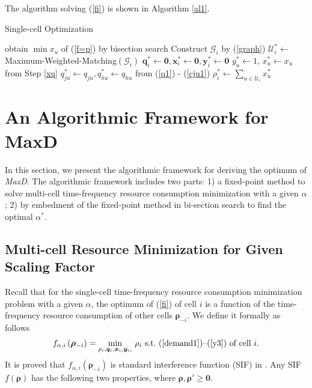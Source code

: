 \documentclass[10pt,journal,final,finalsubmission,twocolumn]{IEEEtran}
\begin{document}
The algorithm solving (\ref{fi}) is shown in Algorithm \ref{al1}.

 \begin{algorithm}[tbp]\label{al1}
\caption{Single-cell Optimization} 
{
	obtain $\min x_u$ of (\ref{f=p}) by bisection search\label{xu}\;
}
Construct $\mathcal{G}_i$ by (\ref{graph})\;
$\mathcal{U}^*_i\leftarrow $ Maximum-Weighted-Matching$\left (\mathcal{G}_i\right)$\label{MWM}\;
$\boldsymbol{q}^*_i \leftarrow \boldsymbol{0},\boldsymbol{x}^*_i \leftarrow \boldsymbol{0}, \boldsymbol{y}^*_i \leftarrow \boldsymbol{0}$\;
{
$y_u^*\leftarrow1$, $x_u^* \leftarrow x_u$ from Step \ref{xu} \;
$q_{ju}^*\leftarrow q_{ju}, q_{hu}^*\leftarrow q_{hu}$ from (\ref{q1}) - (\ref{cju1})\;
}
$\rho_i^*\leftarrow\sum_{u\in{\mathcal{U}}_i} x_u^*$\;
\;
\end{algorithm} 


\section{An Algorithmic Framework for MaxD}\label{CellLoadsMinimization}

In this section, we present the algorithmic framework for deriving the optimum of {\em MaxD}. The algorithmic framework includes two parts: 1) a fixed-point method to solve multi-cell time-frequency resource consumption minimization with a given $\alpha$; 2) by embedment of the fixed-point method in bi-section search to find the optimal $\alpha^*$.

\subsection{Multi-cell Resource Minimization for Given Scaling Factor}\label{MulticellLoadsMinimization}

Recall that for the single-cell time-frequency resource consumption minimization problem with a given $\alpha$, the optimum of (\ref{fi}) of cell $i$ is a function of the time-frequency resource consumption of other cells $\boldsymbol{\rho}_{-i}$. We define it formally as follows
\begin{equation}\label{fi2}
f_{\alpha,i}\left (\boldsymbol{\rho}_{-i}\right ) =  \underset{\rho_i, \boldsymbol{q}_i,\boldsymbol{x}_i,\boldsymbol{y}_i,}{\min} \ \rho_i\  \textup{s.t.\ (\ref{demand1})--(\ref{y3}) of cell $i$} .
\end{equation}
It is proved that $f_{\alpha,i}\left (\boldsymbol{\rho}_{-i}\right )$ is standard interference function (SIF) in \cite{Yates}. Any SIF $f\left( \boldsymbol{\rho}\right)$ has the following two properties, where $\boldsymbol{\rho}, \boldsymbol{\rho}' \geq \boldsymbol{0}$.
\end{document}
